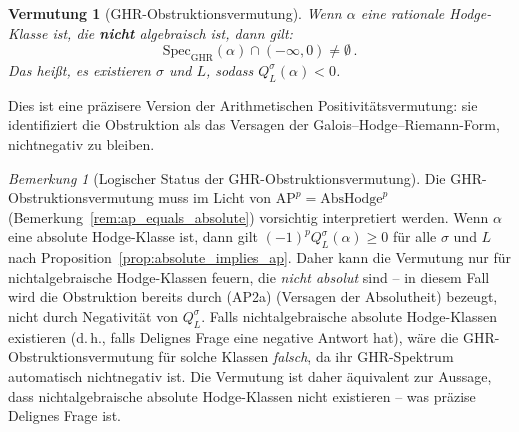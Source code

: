 \documentclass[aps,prd,twocolumn,superscriptaddress,nofootinbib]{revtex4-2}
\newtheorem{conjecture}[theorem]{Vermutung}
\theoremstyle{definition}
\theoremstyle{remark}
\newtheorem{remark}[theorem]{Bemerkung}
\begin{document}
\begin{conjecture}[GHR-Obstruktionsvermutung]
\label{conj:ghr}
Wenn $\alpha$ eine rationale Hodge-Klasse ist, die \textbf{nicht} algebraisch ist, dann gilt:
\begin{equation}
\mathrm{Spec}_{\mathrm{GHR}}(\alpha) \cap (-\infty, 0) \neq \emptyset\,.
\end{equation}
Das heißt, es existieren $\sigma$ und $L$, sodass $Q_L^\sigma(\alpha) < 0$.
\end{conjecture}

Dies ist eine präzisere Version der Arithmetischen Positivitätsvermutung: sie identifiziert die Obstruktion als das Versagen der Galois--Hodge--Riemann-Form, nichtnegativ zu bleiben.

\begin{remark}[Logischer Status der GHR-Obstruktionsvermutung]
\label{rem:ghr_status}
Die GHR-Obstruktionsvermutung muss im Licht von $\mathrm{AP}^p = \mathrm{AbsHodge}^p$ (Bemerkung~\ref{rem:ap_equals_absolute}) vorsichtig interpretiert werden. Wenn $\alpha$ eine absolute Hodge-Klasse ist, dann gilt $(-1)^p Q_L^\sigma(\alpha) \geq 0$ für alle $\sigma$ und $L$ nach Proposition~\ref{prop:absolute_implies_ap}. Daher kann die Vermutung nur für nichtalgebraische Hodge-Klassen \glqq feuern\grqq{}, die \textit{nicht absolut} sind -- in diesem Fall wird die Obstruktion bereits durch (AP2a) (Versagen der Absolutheit) bezeugt, nicht durch Negativität von $Q_L^\sigma$. Falls nichtalgebraische absolute Hodge-Klassen existieren (d.\,h., falls Delignes Frage eine negative Antwort hat), wäre die GHR-Obstruktionsvermutung für solche Klassen \textit{falsch}, da ihr GHR-Spektrum automatisch nichtnegativ ist. Die Vermutung ist daher äquivalent zur Aussage, dass nichtalgebraische absolute Hodge-Klassen nicht existieren -- was präzise Delignes Frage ist.
\end{remark}
\end{document}
